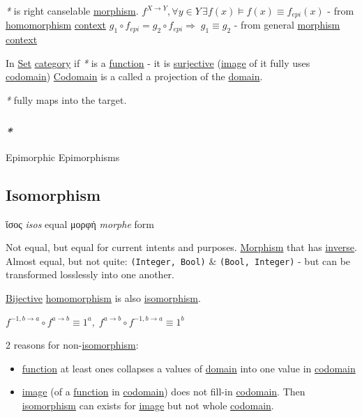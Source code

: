 \documentclass[a4paper,14pt,oneside]{book}
\begin{document}
\emph{*} is right canselable \hyperref[org60b7530]{morphism}.
\(f^{X \to Y}, \forall y \in Y \, \exists f(x) \vDash f(x) \equiv f_{epi}(x)\) - from \hyperref[org037eca6]{homomorphism} \hyperref[org93ac18e]{context}
\(g_1 \circ f_{epi} = g_2 \circ f_{epi} \Rightarrow \; g_1 \equiv g_2\) - from general \hyperref[org60b7530]{morphism} \hyperref[org93ac18e]{context}

In \hyperref[org128a409]{Set} \hyperref[orge2e250a]{category} if \emph{*} is a \hyperref[org679af45]{function} - it is \hyperref[orgd0642e2]{surjective} (\hyperref[orgcf22927]{image} of it fully uses \hyperref[org5ec3963]{codomain})
\hyperref[org5ec3963]{Codomain} is a called a projection of the \hyperref[orgd3b5c7f]{domain}.

\emph{*} fully maps into the target.

\subsubsection{\emph{*}}
\label{sec:orga50de28}

\label{org65001d7}Epimorphic
\label{orgf90b7cf}Epimorphisms

\subsection{\label{orgbdccea4}Isomorphism}
\label{sec:orgde5615f}
ἴσος \emph{isos} equal
μορφή \emph{morphe} form

Not equal, but equal for current intents and purposes.
\hyperref[org60b7530]{Morphism} that has \hyperref[orge2b9b5d]{inverse}.
Almost equal, but not quite: \texttt{(Integer, Bool)} \& \texttt{(Bool, Integer)} - but can be transformed losslessly into one another.

\hyperref[orgc2198b4]{Bijective} \hyperref[org037eca6]{homomorphism} is also \hyperref[orgbdccea4]{isomorphism}.

\(f^{-1, b \to a} \circ f^{a \to b} \equiv 1^a, \; f^{a \to b} \circ f^{-1, b \to a} \equiv 1^b\)

2 reasons for non-\hyperref[orgbdccea4]{isomorphism}:
\begin{itemize}
\item \hyperref[org679af45]{function} at least ones collapses a values of \hyperref[orgd3b5c7f]{domain} into one value in \hyperref[org5ec3963]{codomain}
\item \hyperref[orgcf22927]{image} (of a \hyperref[org679af45]{function} in \hyperref[org5ec3963]{codomain}) does not fill-in \hyperref[org5ec3963]{codomain}. Then \hyperref[orgbdccea4]{isomorphism} can exists for \hyperref[orgcf22927]{image} but not whole \hyperref[org5ec3963]{codomain}.
\end{itemize}
\end{document}
